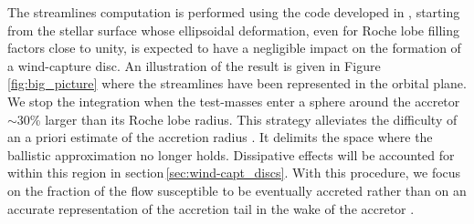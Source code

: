 \documentclass{aa}
\begin{document}
The streamlines computation is performed using the code developed in \cite{ElMellah2016a}, starting from the stellar surface whose ellipsoidal deformation, even for Roche lobe filling factors close to unity, is expected to have a negligible impact on the formation of a wind-capture disc. An illustration of the result is given in Figure\,\ref{fig:big_picture} where the streamlines have been represented in the orbital plane. We stop the integration when the test-masses enter a sphere around the accretor $\sim$30\% larger than its Roche lobe radius. This strategy alleviates the difficulty of an a priori estimate of the accretion radius \citep[the critical impact parameter below which test-masses are captured in the Bondi-Hoyle-Lyttleton formalism][]{Edgar:2004ip}. It delimits the space where the ballistic approximation no longer holds. Dissipative effects will be accounted for within this region in section\,\ref{sec:wind-capt_discs}. With this procedure, we focus on the fraction of the flow susceptible to be eventually accreted rather than on an accurate representation of the accretion tail in the wake of the accretor \citep[for this component, see rather][]{Manousakis2013}.
\end{document}
